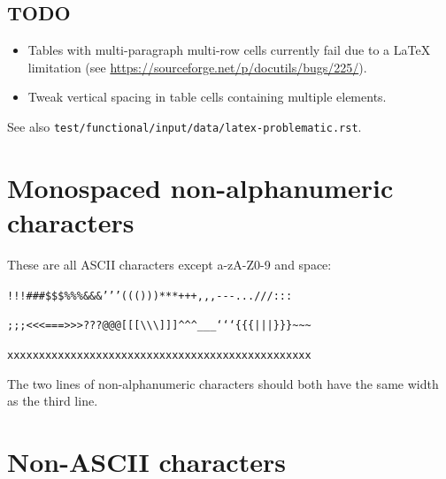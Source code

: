 \documentclass[a4paper]{article}
\begin{document}
\subsection{TODO}

\begin{itemize}
\item Tables with multi-paragraph multi-row cells currently fail due to a
LaTeX limitation (see \url{https://sourceforge.net/p/docutils/bugs/225/}).

\item Tweak vertical spacing in table cells containing multiple elements.
\end{itemize}

See also \texttt{test/functional/input/data/latex-problematic.rst}.


\section{Monospaced non-alphanumeric characters}

These are all ASCII characters except a-zA-Z0-9 and space:

\texttt{!!!\textquotedbl{}\textquotedbl{}\textquotedbl{}\#\#\#\$\$\$\%\%\%\&\&\&'{}'{}'((()))***+++,{},{},-{}-{}-...///:::}

\texttt{;;;<{}<{}<===>{}>{}>???@@@{[}{[}{[}\textbackslash{}\textbackslash{}\textbackslash{}{]}{]}{]}\textasciicircum{}\textasciicircum{}\textasciicircum{}\_\_\_`{}`{}`\{\{\{|||\}\}\}\textasciitilde{}\textasciitilde{}\textasciitilde{}}

\texttt{xxxxxxxxxxxxxxxxxxxxxxxxxxxxxxxxxxxxxxxxxxxxxxxx}

The two lines of non-alphanumeric characters should both have the same
width as the third line.


\section{Non-ASCII characters}
\end{document}
